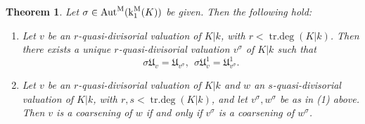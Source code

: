 \documentclass[11pt]{amsart}
\newtheorem{theorem}[proposition]{Theorem}
\theoremstyle{definition}
\theoremstyle{remark}
\numberwithin{equation}{section}
\DeclareMathOperator{\Aut}{Aut}
\DeclareMathOperator{\trdeg}{tr.deg}
\newcommand{\Ufrak}{\mathfrak{U}}
\newcommand{\Autm}{\Aut^{\rm M}}
\renewcommand{\k}{\operatorname{k}^{\rm M}}
\begin{document}
\begin{theorem}
\label{theorem: localthy / qpd / main-qpd}
  Let $\sigma \in \Autm(\k_1(K))$ be given.
  Then the following hold:
  \begin{enumerate}
    \item Let $v$ be an $r$-quasi-divisorial valuation of $K|k$, with $r < \trdeg(K|k)$.
    Then there exists a unique $r$-quasi-divisorial valuation $v^\sigma$ of $K|k$ such that
    \[ \sigma\Ufrak_v = \Ufrak_{v^\sigma}, \ \ \sigma\Ufrak_v^1 = \Ufrak_{v^\sigma}^1. \]
    \item Let $v$ be an $r$-quasi-divisorial valuation of $K|k$ and $w$ an $s$-quasi-divisorial valuation of $K|k$, with $r,s < \trdeg(K|k)$, and let $v^\sigma,w^\sigma$ be as in (1) above.
    Then $v$ is a coarsening of $w$ if and only if $v^\sigma$ is a coarsening of $w^\sigma$.
  \end{enumerate}
\end{theorem}
\end{document}
